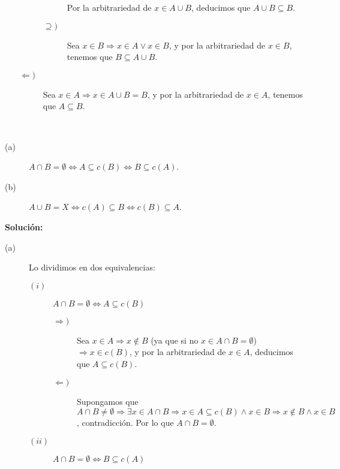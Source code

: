 \begin{ejercicio}
\begin{enumerate}
\begin{description}
\begin{description}
                            Por la arbitrariedad de $x\in A\cup B$, deducimos que $A\cup B\subseteq B$.
                        \item [$\supseteq)$] 
                            Sea $x\in B\Longrightarrow x\in A\lor x\in B$, y por la arbitrariedad de $x\in B$, tenemos que $B\subseteq A\cup B$.
                    \end{description}
                \item [$\Longleftarrow)$] Sea $x\in A\Longrightarrow x\in A\cup B =B$, y por la arbitrariedad de $x\in A$, tenemos que $A\subseteq B$.
            \end{description}
    \end{enumerate}
\end{ejercicio}

\begin{ejercicio}
    \ 
    \begin{description}
        \item [(a)] $A\cap B = \emptyset \Longleftrightarrow A \subseteq c(B) \Longleftrightarrow B\subseteq c(A)$.
        \item [(b)] $A\cup B = X \Longleftrightarrow c(A) \subseteq B \Longleftrightarrow c(B)\subseteq A$.
    \end{description}
    \textbf{Solución:}
    \begin{description}
        \item [(a)] Lo dividimos en dos equivalencias:
            \begin{description}
                \item [$(i)$] $A\cap B=\emptyset \Longleftrightarrow A\subseteq c(B)$
                    \begin{description}
                        \item [$\Longrightarrow)$] Sea $x\in A\Longrightarrow x\notin B$ (ya que si no $x\in A\cap B=\emptyset $) $\Longrightarrow x\in c(B)$, y por la arbitrariedad de $x\in A$, deducimos que $A\subseteq c(B)$.
                        \item [$\Longleftarrow)$] Supongamos que $A\cap B\neq \emptyset \Longrightarrow \exists x\in A\cap B\Longrightarrow {x\in A\subseteq c(B)} \land {x\in B} \Longrightarrow x\notin B \land x\in B$, contradicción. Por lo que $A\cap B = \emptyset $.
                    \end{description}
                \item [$(ii)$] $A\cap B=\emptyset \Longleftrightarrow B\subseteq c(A)$


\end{description}
\end{description}
\end{ejercicio}
